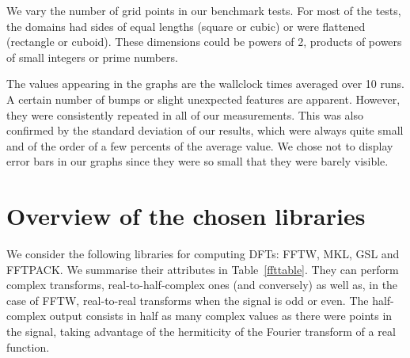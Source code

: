 \documentclass[12pt, a4paper]{article} \setlength{\textheight}{24cm}
\begin{document}
We vary the number of grid points in our benchmark tests. For most of
the tests, the domains had sides of equal lengths (square or cubic) or
were flattened (rectangle or cuboid). These dimensions could be powers
of 2, products of powers of small integers or prime numbers.

The values appearing in the graphs are the wallclock times averaged
over 10 runs. A certain number of bumps or slight unexpected features
are apparent. However, they were consistently repeated in all of our
measurements. This was also confirmed by the standard deviation of our
results, which were always quite small and of the order of a few
percents of the average value. We chose not to display error bars in
our graphs since they were so small that they were barely visible.

\section{Overview of the chosen libraries}
We consider the following libraries for computing DFTs: FFTW, MKL, GSL
and FFTPACK. We summarise their attributes in
Table~\ref{ffttable}. They can perform complex transforms,
real-to-half-complex ones (and conversely) as well as, in the case of
FFTW, real-to-real transforms when the signal is odd or even. The
half-complex output consists in half as many complex values as there
were points in the signal, taking advantage of the hermiticity of the
Fourier transform of a real function.
\end{document}

